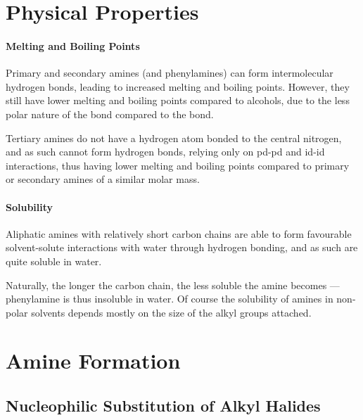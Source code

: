 



	\section{Physical Properties}

		\paragraph{Melting and Boiling Points}

		Primary and secondary amines (and phenylamines) can form intermolecular hydrogen bonds, leading to increased melting and boiling points.
		However, they still have lower melting and boiling points compared to alcohols, due to the less polar nature of the  bond compared
		to the  bond.

		Tertiary amines do not have a hydrogen atom bonded to the central nitrogen, and as such cannot form hydrogen bonds, relying only on pd-pd
		and id-id interactions, thus having lower melting and boiling points compared to primary or secondary amines of a similar molar mass.


		\paragraph{Solubility}

		Aliphatic amines with relatively short carbon chains are able to form favourable solvent-solute interactions with water through hydrogen
		bonding, and as such are quite soluble in water.

		Naturally, the longer the carbon chain, the less soluble the amine becomes --- phenylamine is thus insoluble in water. Of course the
		solubility of amines in non-polar solvents depends mostly on the size of the alkyl groups attached.




	\pagebreak
	\section{Amine Formation}

		\subsection{Nucleophilic Substitution of Alkyl Halides}

